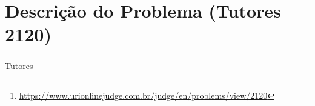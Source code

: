 \section{Descrição do Problema (Tutores 2120)} \label{sec:tutores}
Tutores\footnote{\url{https://www.urionlinejudge.com.br/judge/en/problems/view/2120}}
